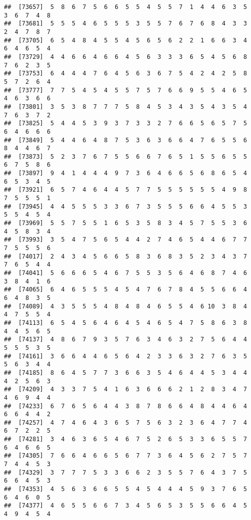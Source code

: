 \documentclass[
]{book}
\begin{document}
\begin{verbatim}
##  [73657]  5  8  6  7  5  6  6  5  5  4  5  5  7  1  4  4  6  3  5  3  6  7  4  8
##  [73681]  5  5  5  4  6  5  5  5  3  5  5  7  6  7  6  8  4  3  3  2  4  7  8  7
##  [73705]  6  5  4  8  4  5  5  4  5  6  5  6  2  2  1  6  6  3  4  6  4  6  5  4
##  [73729]  4  4  6  6  4  6  6  4  5  6  3  3  3  6  5  4  5  6  8  7  6  2  3  5
##  [73753]  6  4  4  4  7  6  4  5  6  3  6  7  5  4  2  4  2  5  8  5  7  2  6  4
##  [73777]  7  7  5  4  5  4  5  5  7  5  7  6  6  9  5  5  4  6  5  4  6  3  6  6
##  [73801]  3  5  3  8  7  7  7  5  8  4  5  3  4  3  5  4  3  5  4  7  6  3  7  2
##  [73825]  5  4  4  5  3  9  3  7  3  3  2  7  6  6  5  6  5  7  5  6  4  6  6  6
##  [73849]  5  4  4  6  4  8  7  5  3  6  3  6  6  4  7  6  5  5  6  8  4  4  6  7
##  [73873]  5  2  3  7  6  7  5  5  6  6  7  6  5  1  5  5  6  5  5  6  7  5  8  6
##  [73897]  9  4  1  4  4  4  9  7  3  6  4  6  6  5  6  8  6  5  4  6  5  3  4  5
##  [73921]  6  5  7  4  6  4  4  5  7  7  5  5  5  5  5  5  4  9  8  7  5  5  5  1
##  [73945]  4  4  5  5  5  3  3  6  7  3  5  5  5  6  6  4  5  5  3  5  5  4  5  4
##  [73969]  5  5  7  5  5  1  6  5  3  5  8  3  4  5  7  5  5  3  6  4  5  8  3  4
##  [73993]  3  5  4  7  5  6  5  4  4  2  7  4  6  5  4  4  6  7  7  7  5  5  5  6
##  [74017]  2  4  3  4  5  6  6  5  8  3  6  8  3  5  2  3  4  3  7  7  6  5  4  4
##  [74041]  5  6  6  6  5  4  6  7  5  5  3  5  6  4  6  8  7  4  6  3  8  4  1  6
##  [74065]  6  4  6  5  5  5  4  5  4  7  6  7  8  4  5  5  6  6  4  6  4  8  3  5
##  [74089]  4  3  5  5  5  4  8  4  8  4  6  5  5  4  6 10  3  8  4  4  7  5  5  4
##  [74113]  6  5  4  5  6  4  6  4  5  4  6  5  4  7  5  8  6  3  8  4  4  5  6  5
##  [74137]  4  8  6  7  9  3  5  7  6  3  4  6  3  2  7  5  6  4  4  5  5  5  3  5
##  [74161]  3  6  6  4  4  6  5  6  4  2  3  3  6  3  2  7  6  3  5  5  6  3  4  4
##  [74185]  8  6  4  5  7  7  3  6  6  3  5  4  6  4  4  5  3  4  4  4  2  5  6  3
##  [74209]  4  3  3  7  5  4  1  6  3  6  6  6  2  1  2  8  3  4  7  4  6  9  4  4
##  [74233]  6  7  6  5  6  4  4  3  8  7  8  6  6  4  8  4  4  6  4  6  6  4  4  2
##  [74257]  4  7  4  6  4  3  6  5  7  5  6  3  2  3  6  4  7  7  4  6  7  2  2  5
##  [74281]  3  4  6  3  6  5  4  6  7  5  2  6  5  3  3  6  5  5  7  6  4  6  6  5
##  [74305]  7  6  6  4  6  6  5  6  7  7  3  6  4  5  6  2  7  5  7  7  4  4  5  3
##  [74329]  3  7  7  7  5  3  3  6  6  2  3  5  5  7  6  4  3  7  5  6  6  4  5  3
##  [74353]  4  5  6  3  6  6  5  5  4  5  4  4  4  5  9  3  7  6  5  6  4  6  0  5
##  [74377]  4  6  5  5  6  6  7  3  4  5  6  5  3  5  5  6  6  4  5  4  9  4  5  4

\end{verbatim}
\end{document}
